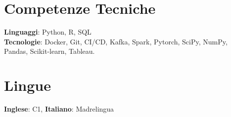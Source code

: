 \resumeSubHeadingListEnd


\section{Competenze Tecniche}
    \begin{itemize}[leftmargin=0.15in, label={}]
	\small{\item{
		\textbf{Linguaggi}{: Python, R, SQL} \\
		\textbf{Tecnologie}{: Docker, Git, CI/CD, Kafka, Spark, Pytorch, SciPy, NumPy, Pandas, Scikit-learn, Tableau.} \\}}
    \end{itemize}

\section{Lingue}
     \begin{itemize}[leftmargin=0.15in, label={}]
 	\small{\item{
 		\textbf{Inglese}: C1, \textbf{Italiano}: Madrelingua }}
     \end{itemize}
